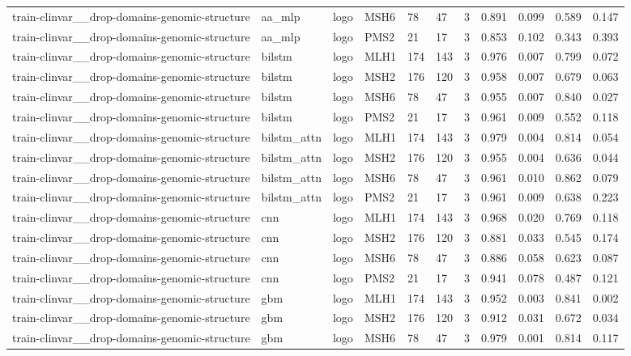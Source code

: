 \begin{table}[t]
\begin{tabular}{lllllllllll}
train-clinvar\_\_drop-domains-genomic-structure & aa\_mlp & logo & MSH6 & 78 & 47 & 3 & 0.891 & 0.099 & 0.589 & 0.147 \\
train-clinvar\_\_drop-domains-genomic-structure & aa\_mlp & logo & PMS2 & 21 & 17 & 3 & 0.853 & 0.102 & 0.343 & 0.393 \\
train-clinvar\_\_drop-domains-genomic-structure & bilstm & logo & MLH1 & 174 & 143 & 3 & 0.976 & 0.007 & 0.799 & 0.072 \\
train-clinvar\_\_drop-domains-genomic-structure & bilstm & logo & MSH2 & 176 & 120 & 3 & 0.958 & 0.007 & 0.679 & 0.063 \\
train-clinvar\_\_drop-domains-genomic-structure & bilstm & logo & MSH6 & 78 & 47 & 3 & 0.955 & 0.007 & 0.840 & 0.027 \\
train-clinvar\_\_drop-domains-genomic-structure & bilstm & logo & PMS2 & 21 & 17 & 3 & 0.961 & 0.009 & 0.552 & 0.118 \\
train-clinvar\_\_drop-domains-genomic-structure & bilstm\_attn & logo & MLH1 & 174 & 143 & 3 & 0.979 & 0.004 & 0.814 & 0.054 \\
train-clinvar\_\_drop-domains-genomic-structure & bilstm\_attn & logo & MSH2 & 176 & 120 & 3 & 0.955 & 0.004 & 0.636 & 0.044 \\
train-clinvar\_\_drop-domains-genomic-structure & bilstm\_attn & logo & MSH6 & 78 & 47 & 3 & 0.961 & 0.010 & 0.862 & 0.079 \\
train-clinvar\_\_drop-domains-genomic-structure & bilstm\_attn & logo & PMS2 & 21 & 17 & 3 & 0.961 & 0.009 & 0.638 & 0.223 \\
train-clinvar\_\_drop-domains-genomic-structure & cnn & logo & MLH1 & 174 & 143 & 3 & 0.968 & 0.020 & 0.769 & 0.118 \\
train-clinvar\_\_drop-domains-genomic-structure & cnn & logo & MSH2 & 176 & 120 & 3 & 0.881 & 0.033 & 0.545 & 0.174 \\
train-clinvar\_\_drop-domains-genomic-structure & cnn & logo & MSH6 & 78 & 47 & 3 & 0.886 & 0.058 & 0.623 & 0.087 \\
train-clinvar\_\_drop-domains-genomic-structure & cnn & logo & PMS2 & 21 & 17 & 3 & 0.941 & 0.078 & 0.487 & 0.121 \\
train-clinvar\_\_drop-domains-genomic-structure & gbm & logo & MLH1 & 174 & 143 & 3 & 0.952 & 0.003 & 0.841 & 0.002 \\
train-clinvar\_\_drop-domains-genomic-structure & gbm & logo & MSH2 & 176 & 120 & 3 & 0.912 & 0.031 & 0.672 & 0.034 \\
train-clinvar\_\_drop-domains-genomic-structure & gbm & logo & MSH6 & 78 & 47 & 3 & 0.979 & 0.001 & 0.814 & 0.117 \\

\end{tabular}
\end{table}
